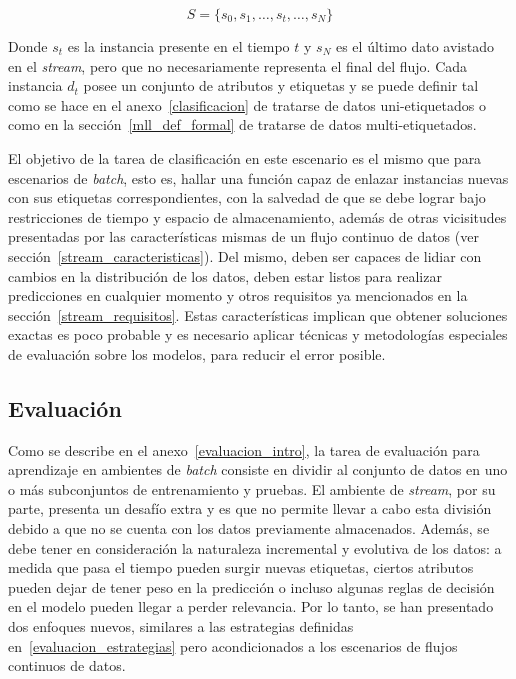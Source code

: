 \begin{equation}
	S = \{s_{0}, s_{1}, \dots, s_{t}, \dots, s_{N}\}
\end{equation}

Donde $s_{t}$ es la instancia presente en el tiempo $t$ y $s_{N}$ es el último
dato avistado en el \textit{stream}, pero que no necesariamente representa el
final del flujo. Cada instancia $d_{t}$ posee un conjunto de atributos y
etiquetas y se puede definir tal como se hace en el anexo~\ref{clasificacion} de
tratarse de datos uni-etiquetados o como en la sección~\ref{mll_def_formal} de
tratarse de datos multi-etiquetados.

El objetivo de la tarea de clasificación en este escenario es el mismo que para
escenarios de \textit{batch}, esto es, hallar una función capaz de enlazar
instancias nuevas con sus etiquetas correspondientes, con la salvedad de que se
debe lograr bajo restricciones de tiempo y espacio de almacenamiento, además de
otras vicisitudes presentadas por las características mismas de un flujo
continuo de datos (ver sección~\ref{stream_caracteristicas}). Del mismo, deben
ser capaces de lidiar con cambios en la distribución de los datos, deben estar
listos para realizar predicciones en cualquier momento y otros requisitos ya
mencionados en la sección~\ref{stream_requisitos}. Estas características
implican que obtener soluciones exactas es poco probable y es necesario aplicar
técnicas y metodologías especiales de evaluación sobre los modelos, para reducir
el error posible.

\subsection{Evaluación}
\label{stream_evaluacion}

Como se describe en el anexo~\ref{evaluacion_intro}, la tarea de evaluación para
aprendizaje en ambientes de \textit{batch} consiste en dividir al conjunto de
datos en uno o más subconjuntos de entrenamiento y pruebas.  El ambiente de
\textit{stream}, por su parte, presenta un desafío extra y es que no permite
llevar a cabo esta división debido a que no se cuenta con los datos previamente
almacenados. Además, se debe tener en consideración la naturaleza incremental y
evolutiva de los datos: a medida que pasa el tiempo pueden surgir nuevas
etiquetas, ciertos atributos pueden dejar de tener peso en la predicción o
incluso algunas reglas de decisión en el modelo pueden llegar a perder
relevancia. Por lo tanto, se han presentado dos enfoques nuevos, similares a las
estrategias definidas en~\ref{evaluacion_estrategias} pero acondicionados a los
escenarios de flujos continuos de datos.

